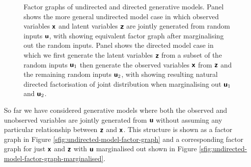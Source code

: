 \begin{figure}[!t]
\begin{subfigure}[t]{.2\linewidth}
\centering
{}
\caption{}\label{sfig:directed-model-factor-graph-marginalised}
\end{subfigure}%
\caption[Undirected and directed generative models.]{Factor graphs of undirected and directed generative models. Panel  shows the more general undirected model case in which observed variables $\boldsymbol{\mathsf{x}}$ and latent variables $\boldsymbol{\mathsf{z}}$ are jointly generated from random inputs $\boldsymbol{\mathsf{u}}$, with  showing equivalent factor graph after marginalising out the random inputs. Panel  shows the directed model case in which we first generate the latent variables $\boldsymbol{\mathsf{z}}$ from a subset of the random inputs $\boldsymbol{\mathsf{u}}_{1}$ then generate the observed variables $\boldsymbol{\mathsf{x}}$ from $\boldsymbol{\mathsf{z}}$ and the remaining random inputs $\boldsymbol{\mathsf{u}}_{2}$, with  showing resulting natural directed factorisation of joint distribution when marginalising out $\boldsymbol{\mathsf{u}}_1$ and $\boldsymbol{\mathsf{u}}_2$.}
\label{fig:directed-undirected-model-graphs}
\end{figure}

So far we have considered generative models where both the observed and unobserved variables are jointly generated from $\boldsymbol{\mathsf{u}}$ without assuming any particular relationship between $\boldsymbol{\mathsf{z}}$ and $\boldsymbol{\mathsf{x}}$. This structure is shown as a factor graph in Figure \ref{sfig:undirected-model-factor-graph} and a corresponding factor graph for just $\boldsymbol{\mathsf{x}}$ and $\boldsymbol{\mathsf{z}}$ with $\boldsymbol{\mathsf{u}}$ marginalised out shown in Figure \ref{sfig:undirected-model-factor-graph-marginalised}. 

